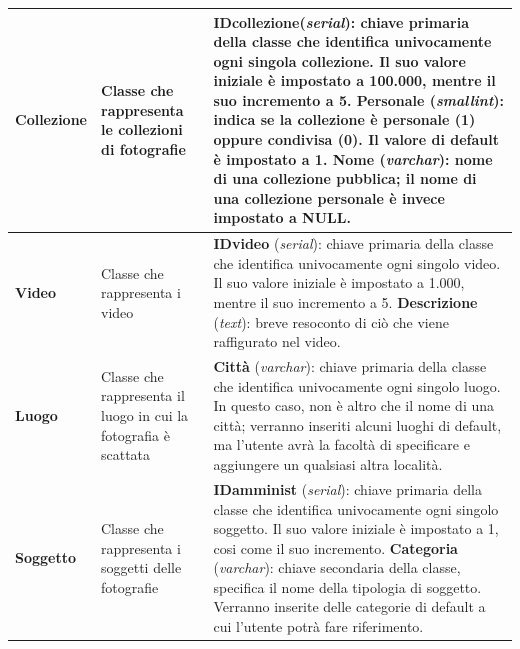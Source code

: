 \documentclass[a4paper]{article}
\begin{document}
	\begin{tabular}{p{90pt}p{120pt}p{150pt}}
		\hline
		\textbf{Collezione} &
		Classe che rappresenta le collezioni di fotografie &
		\textbf{ID\textunderscore collezione}(\emph{serial}):
		chiave
		primaria della classe che identifica univocamente
		ogni singola collezione. Il suo valore iniziale è
		impostato
		a 100.000, mentre il suo incremento a 5.\newline 
		\textbf{Personale} (\emph{smallint}): indica se la
		collezione
		è personale (1) oppure condivisa
		(0). Il valore di default è impostato a 1.\newline
		\textbf{Nome} (\emph{varchar}): nome di una
		collezione
		pubblica; il nome di una collezione personale è
		invece impostato a NULL.	
		\\
		\hline

		\textbf{Video} &
		Classe che rappresenta i video &
		\textbf{ID\textunderscore video} (\emph{serial}):
		chiave
		primaria della classe che identifica univocamente
		ogni singolo video. Il suo valore iniziale è
		impostato
		a 1.000, mentre il suo incremento a 5.\newline 
		\textbf{Descrizione} (\emph{text}): breve resoconto
		di ciò che
		viene raffigurato nel video.
		\\
		\hline

		\textbf{Luogo} &
		Classe che rappresenta il luogo in cui la fotografia
		è scattata &
		\textbf{Città} (\emph{varchar}): chiave
		primaria della classe che identifica univocamente
		ogni singolo luogo. In questo caso, non è altro che
		il
		nome di una città; verranno inseriti alcuni luoghi di
		default, ma l'utente avrà la facoltà di specificare e
		aggiungere
		un qualsiasi altra località.\newline 
		\\
		\hline

		
		\textbf{Soggetto} &
		Classe che rappresenta i soggetti delle fotografie &
		\textbf{ID\textunderscore amminist} (\emph{serial}):
		chiave
		primaria della classe che identifica univocamente
		ogni singolo soggetto. Il suo valore iniziale è
		impostato
		a 1, cosi come il suo incremento.\newline 
		\textbf{Categoria} (\emph{varchar}): chiave
		secondaria
		della classe, specifica il nome della tipologia di
		soggetto. Verranno inserite delle categorie di
		default a
		cui l'utente potrà fare riferimento.
		\\
		\hline
	\end{tabular}
	
\end{document}
